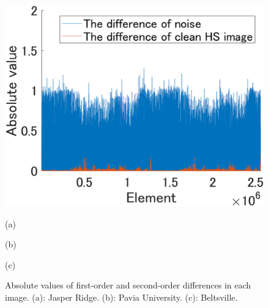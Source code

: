 \begin{figure}[t]
\begin{center}
		\begin{minipage}{0.320\hsize}
			\centerline{\includegraphics[width=\hsize]{./fig_supplement/compare_sparsity/Beltsville_second_order_differences.eps}}
		\end{minipage}
		
		\begin{minipage}{0.005\hsize}
			\centerline{\hspace{\hsize}} %
		\end{minipage}
		\begin{minipage}{0.320\hsize}
			\centerline{\small{(a)}}
		\end{minipage}
		\begin{minipage}{0.320\hsize}
			\centerline{\small{(b)}}
		\end{minipage}
		\begin{minipage}{0.320\hsize}
			\centerline{\small{(c)}}
		\end{minipage}
		
	\end{center}
	
	\caption{Absolute values of first-order and second-order differences in each image. (a): Jasper Ridge. (b): Pavia University. (c): Beltsville.}
	
	\label{fig:comparison_sparsity}
\end{figure}